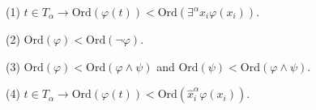 (1) $t \in T_\alpha \rightarrow \text{Ord}(\varphi(t)) < \text{Ord}(\exists^\alpha x_i \varphi(x_i))$.

(2) $\text{Ord}(\varphi) < \text{Ord}(\neg \varphi)$.

(3) $\text{Ord}(\varphi) < \text{Ord}(\varphi \wedge \psi)$ and $\text{Ord}(\psi) < \text{Ord}(\varphi \wedge \psi)$.

(4) $t \in T_\alpha \rightarrow \text{Ord}(\varphi(t)) < \text{Ord}(\hat{x}_i^\alpha \varphi(x_i))$.

